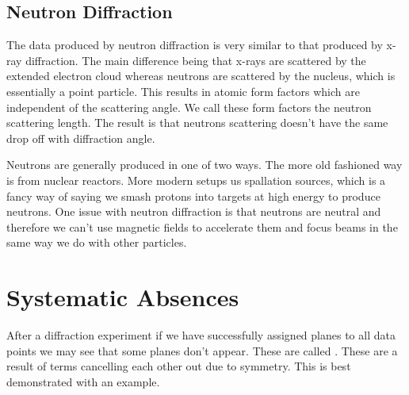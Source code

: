 \documentclass[fleqn]{NotesClass}
\begin{document}
    \subsection{Neutron Diffraction}
    The data produced by neutron diffraction is very similar to that produced by x-ray diffraction.
    The main difference being that x-rays are scattered by the extended electron cloud whereas neutrons are scattered by the nucleus, which is essentially a point particle.
    This results in atomic form factors which are independent of the scattering angle.
    We call these form factors the neutron scattering length.
    The result is that neutrons scattering doesn't have the same drop off with diffraction angle.
    
    Neutrons are generally produced in one of two ways.
    The more old fashioned way is from nuclear reactors.
    More modern setups us spallation sources, which is a fancy way of saying we smash protons into targets at high energy to produce neutrons.
    One issue with neutron diffraction is that neutrons are neutral and therefore we can't use magnetic fields to accelerate them and focus beams in the same way we do with other particles.
    
    \section{Systematic Absences}
    After a diffraction experiment if we have successfully assigned planes to all data points we may see that some planes don't appear.
    These are called .
    These are a result of terms cancelling each other out due to symmetry.
    This is best demonstrated with an example.
    
\end{document}
